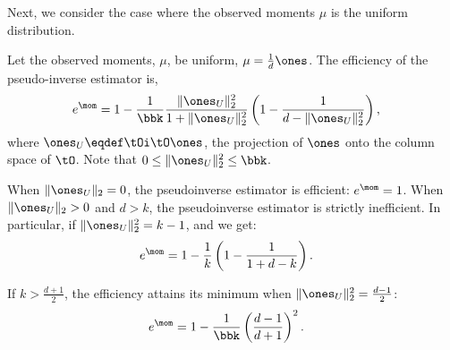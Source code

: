Next, we consider the case where the observed moments $\mu$ is the
uniform distribution.

\begin{lemma}
  Let the observed moments, $\mu$, be uniform, $\mu = \frac{1}{d} \ones$. 
  The efficiency of the pseudo-inverse estimator is, 
  \begin{align}
    e^\mom &= 
    1 - \frac{1}{\bbk}\frac{\|\ones_U\|_2^2}{1 + \|\ones_U\|_2^2} \left( 1 - \frac{1}{d - \|\ones_U\|_2^2} \right),
  \end{align}
  where $\ones_U \eqdef \tOi\tO \ones$, the projection of $\ones$ onto
  the column space of $\tO$. Note that $0 \le \|\ones_U\|^2_2 \le \bbk$.

  When $\|\ones_U\|_2 = 0$, the pseudoinverse estimator is efficient:
  $e^\mom = 1$. When $\|\ones_U\|_2 > 0$ and $d > k$, the pseudoinverse
  estimator is strictly inefficient. 
  In particular, if $\|\ones_U\|^2_2
    = k-1$, and we get:
    \begin{align}
      e^\mom 
      &= 1 - \frac{1}{k} \left(1 - \frac{1}{1 + d - k} \right).
    \end{align}

    If $k > \frac{d+1}{2}$, the efficiency attains its minimum when
    $\|\ones_U\|^2_2 = \frac{d-1}{2}$:
  \begin{align*}
    e^\mom 
    &= 1 - \frac{1}{\bbk} \left( \frac{d-1}{d+1} \right)^2.
  \end{align*}
\end{lemma}
